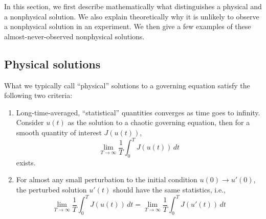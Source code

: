 In this section, we first describe mathematically what distinguishes a physical
and a nonphysical solution.  We also explain theoretically why it is unlikely
to observe a nonphysical solution in an experiment.  We then give a few
examples of these almost-never-observed nonphysical solutions.

\subsection{Physical solutions}
What we typically call ``physical'' solutions to a governing equation satisfy the following
two criteria: 
\begin{enumerate}
    \item Long-time-averaged, ``statistical'' quantities converges as time goes to infinity.
    Consider $u(t)$ as the solution to a chaotic governing equation, then for 
    a smooth quantity of interest $J(u(t))$,
    \begin{equation} \label{longtimeavg}
        \lim_{T\to\infty}\frac1T \int_0^T J(u(t))\,dt
    \end{equation}
    exists.
    \item For almost any small perturbation to the initial condition $u(0)\to u'(0)$, the perturbed
    solution $u'(t)$ should have the same statistics, i.e.,
    \begin{equation}
        \lim_{T\to\infty}\frac1T \int_0^T J(u(t))\,dt
      = \lim_{T\to\infty}\frac1T \int_0^T J(u'(t))\,dt
    \end{equation}
\end{enumerate}


